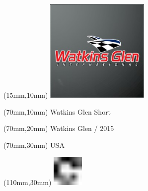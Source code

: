 \null\newpage
\begin{textblock*}{50mm}(15mm,10mm)%
\includegraphics[width=50mm]{LG/2015-05-20_00097.png}
\end{textblock*}
\begin{textblock*}{130mm}(70mm,10mm)%
{\fontsize{20}{20}\selectfont Watkins Glen Short}\\
\end{textblock*}
\begin{textblock*}{120mm}(70mm,20mm)%
{\fontsize{16}{16}\selectfont Watkins Glen / 2015}\\
\end{textblock*}
\begin{textblock*}{120mm}(70mm,30mm)%
{\fontsize{12}{12}\selectfont USA}
\end{textblock*}
\begin{textblock*}{30mm}(110mm,30mm)%
\centering
\includegraphics[height=15mm]{icons/fa-rotate-right.pdf}
\end{textblock*}
